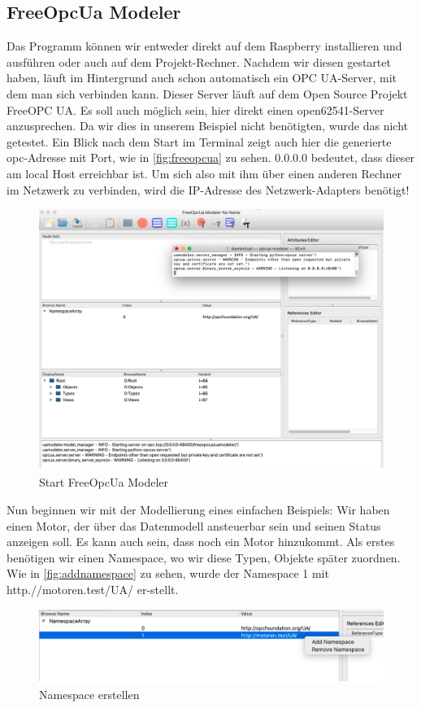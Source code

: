 \subsection{FreeOpcUa Modeler}
Das Programm können wir entweder direkt auf dem Raspberry installieren und ausführen oder auch auf dem Projekt-Rechner.
Nachdem wir diesen gestartet haben, läuft im Hintergrund auch schon automatisch ein OPC UA-Server, mit dem man sich verbinden kann. Dieser Server läuft auf dem Open Source Projekt FreeOPC UA. Es soll auch möglich sein, hier direkt einen open62541-Server anzusprechen. Da wir dies in unserem Beispiel nicht benötigten, wurde das nicht getestet.
Ein Blick nach dem Start im Terminal zeigt auch hier die generierte opc-Adresse mit Port, wie in \autoref{fig:freeopcua} zu sehen. 0.0.0.0 bedeutet, dass dieser am local Host erreichbar ist. Um sich also mit ihm über einen anderen Rechner im Netzwerk zu verbinden, wird die IP-Adresse des Netzwerk-Adapters benötigt!
\begin{figure}[H]
	\centering
	\includegraphics[width=1\linewidth]{abb/FreeOPCUA}
	\caption{Start FreeOpcUa Modeler}
	\label{fig:freeopcua}
\end{figure}
Nun beginnen wir mit der Modellierung eines einfachen Beispiels:
Wir haben einen Motor, der über das Datenmodell ansteuerbar sein und seinen Status anzeigen soll. Es kann auch sein, dass noch ein Motor hinzukommt.
Als erstes benötigen wir einen Namespace, wo wir diese Typen, Objekte später zuordnen. Wie in \autoref{fig:addnamespace} zu sehen, wurde der Namespace 1 mit http.//motoren.test/UA/ er-stellt.
\begin{figure}[H]
	\centering
	\includegraphics[width=1\linewidth]{abb/AddNamespace}
	\caption{Namespace erstellen}
	\label{fig:addnamespace}
\end{figure}
